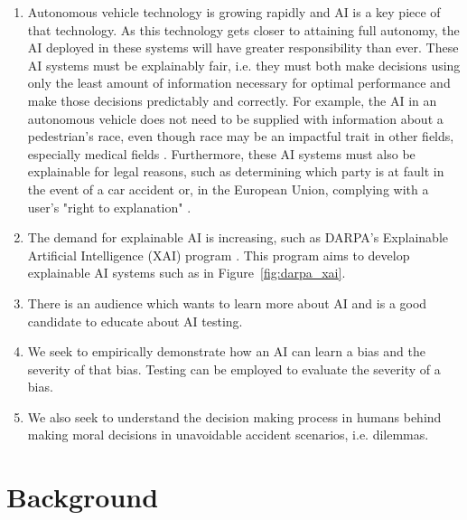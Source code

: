 \documentclass{report}
\begin{document}
\begin{enumerate}
    \item Autonomous vehicle technology is growing rapidly and AI is a key piece of that technology.
    As this technology gets closer to attaining full autonomy, the AI deployed in these systems will
    have greater responsibility than ever. These AI systems must be explainably fair, i.e. they must
    both make decisions using only the least amount of information necessary for optimal performance
    and make those decisions predictably and correctly. For example, the AI in an autonomous vehicle
    does not need to be supplied with information about a pedestrian's race, even though race may be
    an impactful trait in other fields, especially medical fields \cite{sickeCellDisease}.
    Furthermore, these AI systems must also be explainable for legal reasons, such as determining
    which party is at fault in the event of a car accident or, in the European Union, complying with
    a user's "right to explanation" \cite{goodman2017european}.
    
    \item The demand for explainable AI is increasing, such as DARPA's Explainable Artificial
    Intelligence (XAI) program \cite{gunning2016explainable}. This program aims to develop
    explainable AI systems such as in Figure~\ref{fig:darpa_xai}.
    
    \item There is an audience which wants to learn more about AI and is a good candidate to educate
    about AI testing.
    
    \item We seek to empirically demonstrate how an AI can learn a bias and the severity of that
    bias. Testing can be employed to evaluate the severity of a bias.

    \item We also seek to understand the decision making process in humans behind making moral
    decisions in unavoidable accident scenarios, i.e. dilemmas.
\end{enumerate}

\chapter{Background}
\end{document}

